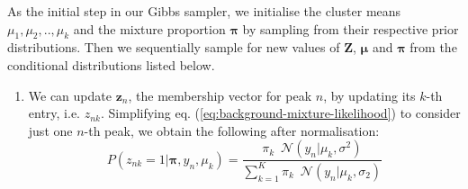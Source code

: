 As the initial step in our Gibbs sampler, we initialise the cluster means $\mu_1,\mu_2,..,\mu_k$ and the mixture proportion $\boldsymbol{\pi}$ by sampling from their respective prior distributions. Then we sequentially sample for new values of $\boldsymbol{Z}$, $\boldsymbol{\mu}$ and $\boldsymbol{\pi}$ from the conditional distributions listed below. 

\begin{enumerate}

\item We can update $\boldsymbol{z}_n$, the membership vector for peak $n$, by updating its $k$-th entry, i.e. $z_{nk}$. Simplifying eq. (\ref{eq:background-mixture-likelihood}) to consider just one $n$-th peak, we obtain the following after normalisation:
\begin{equation}
P(z_{nk}=1 \vert \boldsymbol{\pi}, y_n, \mu_k) = \frac{\pi_k \enspace \mathcal{N}(y_n \vert \mu_k, \sigma^2)}{\sum_{k=1}^K \pi_k \enspace \mathcal{N}(y_n \vert \mu_k, \sigma_2)}
\label{eq:background-mixture-conditional-z}
\end{equation}


\end{enumerate}
